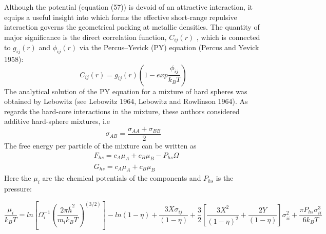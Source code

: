 \documentclass[12pt]{article}
\newcommand*{\1}{\hspace{1pt}}
\begin{document}
Although the potential (equation (57)) is devoid of an attractive interaction, it equips a 
useful insight into which forms the effective short-range repulsive interaction governs the 
geometrical packing at metallic densities. The quantity of major significance is the direct
correlation function, $C_{ij}(r)$ , which is connected to $g_{ij}(r)$ and $\phi_{ij}(r)$ via the Percus–Yevick
(PY) equation (Percus and Yevick 1958):
    \begin{equation}
        C_{ij}(r) = g_{ij}(r)\left(1 - exp\frac{\phi_{ij}}{k_{B}T}\right)          \tag*{(i , j = A , B)}
    \end{equation}
The analytical solution of the PY equation for a mixture of hard spheres was obtained by 
Lebowitz (see Lebowitz 1964, Lebowitz and Rowlinson 1964). As regards the hard-core 
interactions in the mixture, these authors considered additive hard-sphere mixtures, i.e
    \begin{equation}
        \sigma_{AB} = \frac{\sigma_{AA} + \sigma_{BB} }{2}
    \end{equation}
The free energy per particle of the mixture can be written as
\begin{align}
    &  F_{hs} = c_{A}\mu_{A} + c_{B}\mu_{B} - P _{hs}\Omega \\
    &  G_{hs} = c_{A}\mu_{A} + c_{B}\mu_{B}
    \end{align}
Here the $\mu_i$ are the chemical potentials of the components and $P _{hs}$ is the pressure:

    \begin{equation}
        \frac{\mu_i}{k_{B}T} = ln \left[\Omega ^{-1}_{i}\left(\frac{2\pi \overline{h}^2}
        {m_{i}k_{B}T}\right)^(3/2)\right] - ln (1 - \eta) + \frac{3X\sigma_{ij}}{(1 - 
        \eta)} + \frac{3}{2}\left[\frac{3X^2}{(1 - \eta )^2} + \frac{2Y}{(1 - \eta)}\right] 
        \sigma^2_{ii} + \frac{\pi P _{hs}\sigma^3_{ii}}{6k_{B}T}
    \end{equation}
\end{document}
